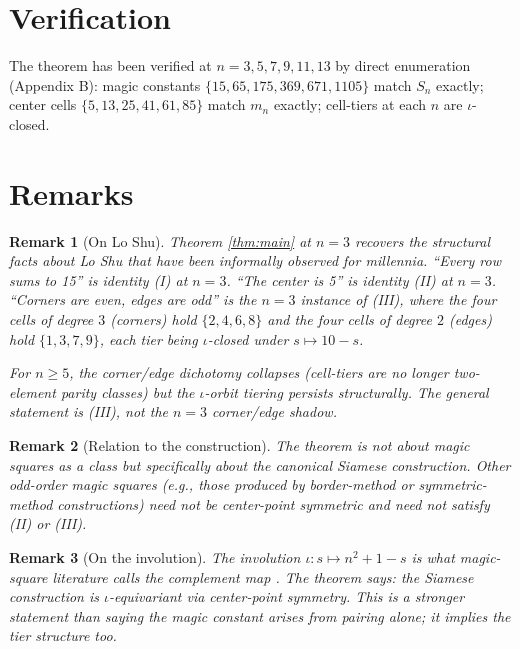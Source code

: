 \documentclass[11pt]{article}
\newtheorem{remark}{Remark}
\begin{document}
\section{Verification}

The theorem has been verified at $n = 3, 5, 7, 9, 11, 13$ by direct
enumeration (Appendix B): magic constants $\{15, 65, 175, 369, 671, 1105\}$
match $S_n$ exactly; center cells $\{5, 13, 25, 41, 61, 85\}$ match $m_n$
exactly; cell-tiers at each $n$ are $\iota$-closed.

\section{Remarks}

\begin{remark}[On Lo Shu]
Theorem \ref{thm:main} at $n = 3$ recovers the structural facts about Lo
Shu that have been informally observed for millennia. ``Every row sums
to 15'' is identity (I) at $n = 3$. ``The center is 5'' is identity (II)
at $n = 3$. ``Corners are even, edges are odd'' is the $n = 3$ instance
of (III), where the four cells of degree $3$ (corners) hold
$\{2, 4, 6, 8\}$ and the four cells of degree $2$ (edges) hold
$\{1, 3, 7, 9\}$, each tier being $\iota$-closed under $s \mapsto 10 - s$.

For $n \geq 5$, the corner/edge dichotomy collapses (cell-tiers are no
longer two-element parity classes) but the $\iota$-orbit tiering
persists structurally. The general statement is (III), not the
$n = 3$ corner/edge shadow.
\end{remark}

\begin{remark}[Relation to the construction]
The theorem is not about magic squares as a class but specifically about
the canonical Siamese construction. Other odd-order magic squares
(e.g., those produced by border-method or symmetric-method constructions)
need not be center-point symmetric and need not satisfy (II) or (III).
\end{remark}

\begin{remark}[On the involution]
The involution $\iota: s \mapsto n^2 + 1 - s$ is what magic-square
literature calls the \emph{complement map} \cite{andrews}. The theorem
says: the Siamese construction is $\iota$-equivariant via center-point
symmetry. This is a stronger statement than saying the magic constant
arises from pairing alone; it implies the tier structure too.
\end{remark}
\end{document}
